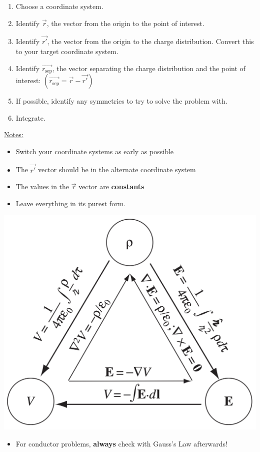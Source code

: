 \documentclass{article}
\newcommand{\sepvec}{\vec{r_\textrm{sep}}}
\newcommand{\formbox}[2]{\begin{center} \begin{tcolorbox}[title = #1, boxrule=2pt,arc=3.4pt,boxsep=0mm] #2\end{tcolorbox}\end{center}}
\begin{document}
\begin{multicols*}{3}
\formbox{Problem Solving Stragegy -- Coulomb Integrals}{
    \begin{enumerate}
        \item Choose a coordinate system.
        \item Identify $\vec{r}$, the vector from the origin to the point of interest.
        \item Identify $\vec{r'}$, the vector from the origin to the charge distribution. Convert this to your target coordinate system.
        \item Identify $\sepvec$, the vector separating the charge distribution and the point of interest:
        $(\sepvec = \vec{r} - \vec{r'})$
        \item If possible, identify any symmetries to try to solve the problem with.
        \item Integrate.
    \end{enumerate}
    \underline{Notes:}
    \begin{itemize}
        \item Switch your coordinate systems as early as possible
        \item The $\vec{r'}$ vector should be in the alternate coordinate system
        \item The values in the $\vec{r}$ vector are \textbf{constants}
        \item Leave everything in its purest form.
    \end{itemize}
}

\formbox{The Electricity and Magnetism Triangle}{
    \begin{center}
        \includegraphics[scale=0.145]{em-triangle}
    \end{center}
}

\formbox{Other Notes}{
    \begin{itemize}
        \item For conductor problems, \textbf{always} check with
        Gauss's Law afterwards!
    \end{itemize}
}

\end{multicols*}
\end{document}
